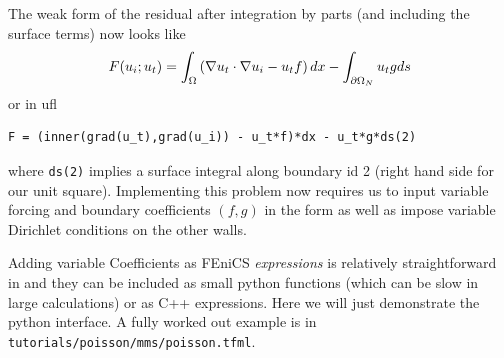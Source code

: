 The weak form of the residual after integration by parts (and
including the surface terms) now looks like
\begin{equation}
  \label{eq:4}
  F(u_{i};u_{t}) = \int_{\Omega}
  \left(
    \nabla u_{t}\cdot\nabla u_{i} - u_{t}f
  \right)dx - \int_{\partial\Omega_{N}} u_{t}g ds
\end{equation}
or in ufl
\begin{lstlisting}[style=ufl]
F = (inner(grad(u_t),grad(u_i)) - u_t*f)*dx - u_t*g*ds(2)
\end{lstlisting}
where \texttt{ds(2)} implies a surface integral along boundary id 2
(right hand side for our unit square). Implementing this problem now
requires us to input variable forcing and boundary coefficients
$(f,g)$ in the form as well as impose variable Dirichlet conditions on
the other walls.

Adding variable Coefficients as FEniCS \emph{expressions} is
relatively straightforward in \TF{} and they can be included as small
python functions (which can be slow in large calculations) or as C++
expressions.  Here we will just demonstrate the python interface.  A
fully worked out example is in \texttt{tutorials/poisson/mms/poisson.tfml}.

